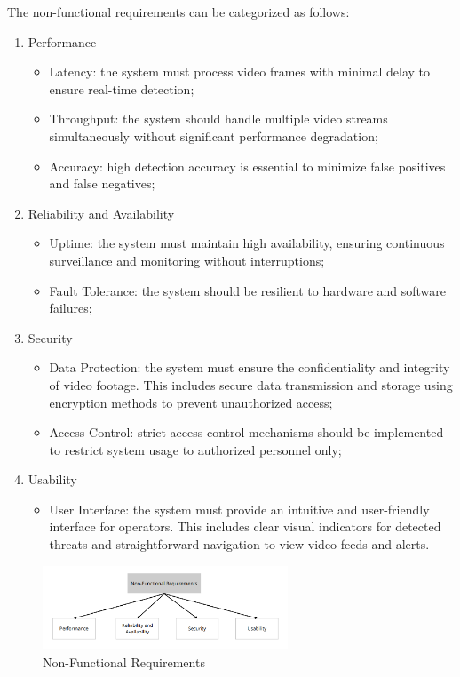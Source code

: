The non-functional requirements can be categorized as follows:
\begin{enumerate}
    \item Performance
    \begin{itemize}
        \item Latency: the system must process video frames with minimal delay to ensure real-time detection;
        \item Throughput: the system should handle multiple video streams simultaneously without significant 
        performance degradation;
        \item Accuracy: high detection accuracy is essential to minimize false positives and false negatives;
    \end{itemize}
    \item Reliability and Availability
    \begin{itemize}
        \item Uptime: the system must maintain high availability, ensuring
        continuous surveillance and monitoring without interruptions;
        \item Fault Tolerance: the system should be resilient to hardware and software failures;
    \end{itemize}
    \item Security
    \begin{itemize}
        \item Data Protection: the system must ensure the confidentiality and integrity of video footage. This includes 
        secure data transmission and storage using encryption methods to prevent unauthorized access;
        \item Access Control: strict access control mechanisms should be implemented to restrict system usage to 
        authorized personnel only;
    \end{itemize}
    \item Usability
    \begin{itemize}
        \item User Interface: the system must provide an intuitive and user-friendly interface for 
        operators. This
        includes clear visual indicators for detected threats and straightforward navigation to view 
        video feeds and alerts.
    \end{itemize}
  \end{enumerate}

  \begin{figure}[ht]
    \centering 
    \includegraphics[width=0.65\textwidth]{figs/requirements.png} 
    \caption{Non-Functional Requirements}
    \label{fig:non-requirements}
\end{figure}